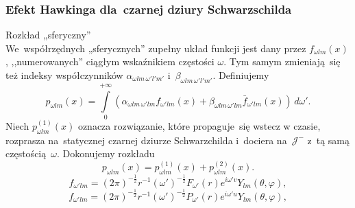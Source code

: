 \documentclass[10pt,t]{beamer}
\begin{document}
\begin{frame}
  \frametitle{Efekt Hawkinga dla~czarnej dziury Schwarzschilda}


  Rozkład „sferyczny” \\
  We~współrzędnych „sferycznych” zupełny układ funkcji jest dany
  przez $f_{ \omega l m }( x )$, ,,numerowanych'' ciągłym
  wskaźnikiem częstości $\omega$. Tym samym zmieniają~się też
  indeksy współczynników $\alpha_{ \omega l m\, \omega' l' m' }$
  i~$\beta_{ \omega l m\, \omega' l' m' }$. Definiujemy
  \begin{equation}
    \label{eq:Promieniowanie-Hawkinga-24}
    p_{ \omega l m }( x ) =
    \int\limits_{ 0 }^{ +\infty } ( \alpha_{ \omega l m\, \omega' l m }
    f_{ \omega' l m }( x ) + \beta_{ \omega l m\, \omega' l m }
    \bar{ f }_{ \omega' l m }( x ) ) \, d \omega'.
  \end{equation}
  Niech $p_{ \omega l m }^{ ( 1 ) }( x )$ oznacza rozwiązanie, które
  propaguje~się wstecz w czasie, rozprasza na~statycznej czarnej
  dziurze Schwarzchilda i~dociera na~$\mathcal{J}^{ - }$ z~tą samą
  częstością~$\omega$. Dokonujemy rozkładu
  \begin{equation}
    \label{eq:Promieniowanie-Hawkinga-25}
    p_{ \omega l m }( x ) =
    p_{ \omega l m }^{ ( 1 ) }( x ) + p_{ \omega l m }^{ ( 2 ) }( x ).
  \end{equation}
  \begin{equation}
    f_{ \omega' l m } =
    ( 2 \pi )^{ - \frac{ 1 }{ 2 } } r^{ - 1 }
    ( \omega' )^{ - \frac{ 1 }{ 2 } } F_{ \omega ' }( r ) e^{ i \omega' v }
    Y_{ l m }( \theta, \varphi ),
  \end{equation}
  \begin{equation}
    f_{ \omega' l m }
    = ( 2 \pi )^{ - \frac{ 1 }{ 2 } }
    r^{ - 1 } ( \omega' )^{ - \frac{ 1 }{ 2 } } P_{ \omega ' }( r )
    e^{ i \omega' u } Y_{ l m }( \theta, \varphi ),
  \end{equation}

\end{frame}
\end{document}
